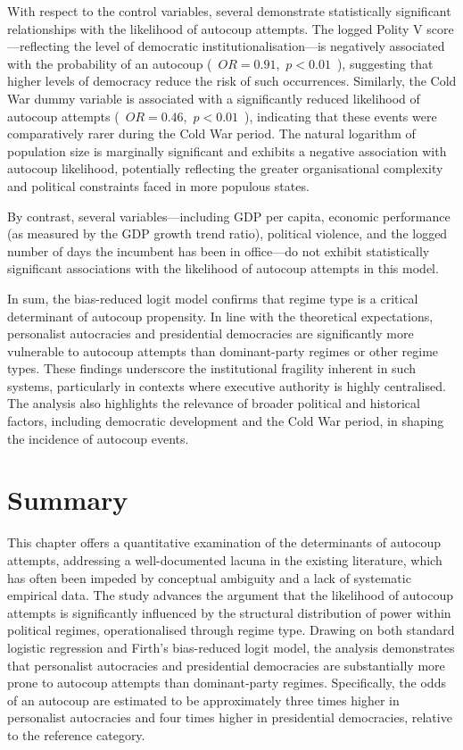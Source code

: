 \documentclass[
  12pt,
]{report}
\begin{document}
With respect to the control variables, several demonstrate statistically
significant relationships with the likelihood of autocoup attempts. The
logged Polity V score---reflecting the level of democratic
institutionalisation---is negatively associated with the probability of
an autocoup (\, \(OR = 0.91\), \,\(p<0.01\) \,), suggesting that higher
levels of democracy reduce the risk of such occurrences. Similarly, the
Cold War dummy variable is associated with a significantly reduced
likelihood of autocoup attempts ( \,\(OR = 0.46\), \,\(p<0.01\) \,),
indicating that these events were comparatively rarer during the Cold
War period. The natural logarithm of population size is marginally
significant and exhibits a negative association with autocoup
likelihood, potentially reflecting the greater organisational complexity
and political constraints faced in more populous states.

By contrast, several variables---including GDP per capita, economic
performance (as measured by the GDP growth trend ratio), political
violence, and the logged number of days the incumbent has been in
office---do not exhibit statistically significant associations with the
likelihood of autocoup attempts in this model.

In sum, the bias-reduced logit model confirms that regime type is a
critical determinant of autocoup propensity. In line with the
theoretical expectations, personalist autocracies and presidential
democracies are significantly more vulnerable to autocoup attempts than
dominant-party regimes or other regime types. These findings underscore
the institutional fragility inherent in such systems, particularly in
contexts where executive authority is highly centralised. The analysis
also highlights the relevance of broader political and historical
factors, including democratic development and the Cold War period, in
shaping the incidence of autocoup events.

\section{Summary}\label{summary-1}

This chapter offers a quantitative examination of the determinants of
autocoup attempts, addressing a well-documented lacuna in the existing
literature, which has often been impeded by conceptual ambiguity and a
lack of systematic empirical data. The study advances the argument that
the likelihood of autocoup attempts is significantly influenced by the
structural distribution of power within political regimes,
operationalised through regime type. Drawing on both standard logistic
regression and Firth's bias-reduced logit model, the analysis
demonstrates that personalist autocracies and presidential democracies
are substantially more prone to autocoup attempts than dominant-party
regimes. Specifically, the odds of an autocoup are estimated to be
approximately three times higher in personalist autocracies and four
times higher in presidential democracies, relative to the reference
category.
\end{document}
